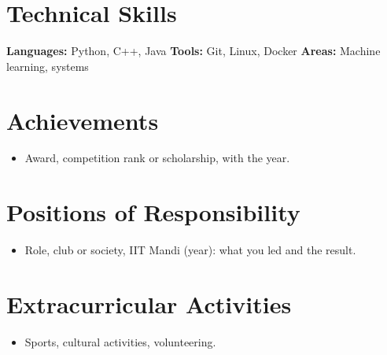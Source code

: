 \documentclass[10pt,a4paper]{article}
\begin{document}
\section{Technical Skills}
\textbf{Languages:} Python, C++, Java \quad
\textbf{Tools:} Git, Linux, Docker \quad
\textbf{Areas:} Machine learning, systems

\section{Achievements}
\begin{itemize}
  \item Award, competition rank or scholarship, with the year.
\end{itemize}

\section{Positions of Responsibility}
\begin{itemize}
  \item Role, club or society, IIT Mandi (year): what you led and the result.
\end{itemize}

\section{Extracurricular Activities}
\begin{itemize}
  \item Sports, cultural activities, volunteering.
\end{itemize}
\end{document}
